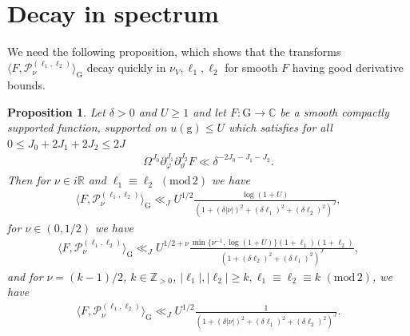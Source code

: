 \documentclass[12pt]{amsart}
\newtheorem{proposition}[theorem]{Proposition}
\theoremstyle{definition}
\theoremstyle{remark}
\numberwithin{equation}{section}
\newcommand{\G}{\mathrm{G}}
\newcommand{\C}{{\mathbb C}}
\newcommand{\R}{{\mathbb R}}
\newcommand{\Z}{{\mathbb Z}}
\newcommand{\1}{{\mathbf 1}}
\newcommand{\g}{\mathrm{g}}
\renewcommand{\pmod}[1]{\,\,(\mathrm{mod}\,{#1})}
\begin{document}
\section{Decay in spectrum}
We need the following proposition, which shows that the transforms $ \langle F, \mathcal{P}^{(\ell_1,\ell_2)}_{\nu}\rangle_{\G}$ decay quickly in $\nu_V,\ell_1,\ell_2$ for smooth $F$ having good derivative bounds.
\begin{proposition}\label{prop:decayspec}
   Let $\delta > 0$ and $U  \geq 1$ and let $F:\G\to \C$ be a smooth compactly supported function, supported on $u(\g) \leq U$ which satisfies for all $0 \leq J_0 +2J_1+2J_2 \leq 2J$ \begin{align}\label{eq:derivbound}
   \Omega^{J_0} \partial_{\varphi}^{J_1} \partial_\vartheta^{J_2} F \ll \delta^{-2J_0-J_1-J_2}.
    \end{align}
 Then for $\nu \in i\R$ and $\ell_1\equiv \ell_2 \pmod{2}$ we have
    \begin{align*}
         \langle F, \mathcal{P}^{(\ell_1,\ell_2)}_{\nu}\rangle_{\G}\ll_J U^{1/2}\frac{ \log(1+U)}{(1+(\delta |\nu|)^2+(\delta \ell_1)^2+(\delta \ell_2)^2)^J},
    \end{align*}
    for $\nu \in (0,1/2)$ we have
     \begin{align*}
         \langle F, \mathcal{P}^{(\ell_1,\ell_2)}_{\nu}\rangle_{\G}\ll_J U^{1/2+\nu} \frac{ \min\{\nu^{-1}, \log(1+U)\}(1+\ell_1)(1+\ell_2)}{(1+(\delta \ell_2)^2+(\delta \ell_1)^2)^J},
    \end{align*}
    and for $\nu=(k-1)/2$, $k \in \Z_{>0}$, $|\ell_1|,|\ell_2| \geq k, \ell_1\equiv \ell_2 \equiv k \pmod{2}$, we have
        \begin{align*}
         \langle F, \mathcal{P}^{(\ell_1,\ell_2)}_{\nu}\rangle_{\G}\ll_J U^{1/2} \frac{1}{(1+(\delta |\nu|)^2+(\delta \ell_1)^2+(\delta \ell_2)^2)^J}.
    \end{align*}
\end{proposition}
\end{document}
